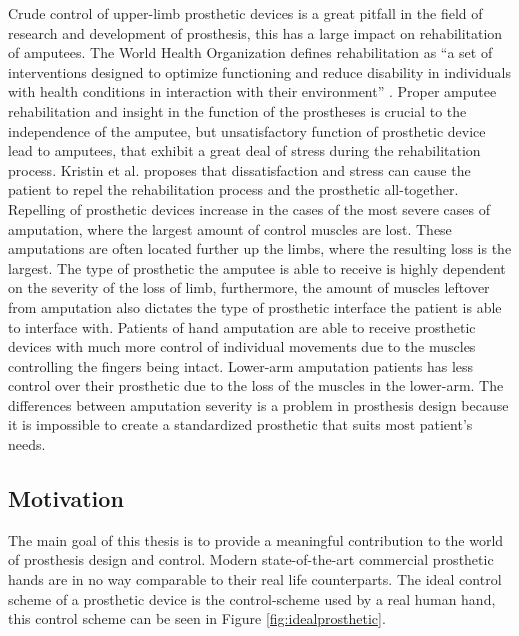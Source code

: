 \documentclass[../main.tex]{subfiles}
\begin{document}
Crude control of upper-limb prosthetic devices is a great pitfall in the field of research and development of prosthesis, this has a large impact on rehabilitation of amputees.
The World Health Organization defines rehabilitation as ``a set of interventions designed to optimize functioning and reduce disability in individuals with health conditions in interaction with their environment'' \cite{WHO_rehab}.
Proper amputee rehabilitation and insight in the function of the prostheses is crucial to the independence of the amputee, but unsatisfactory function of prosthetic device lead to amputees, that exhibit a great deal of stress during the rehabilitation process.
Kristin et al. \cite{Kristin2012} proposes that dissatisfaction and stress can cause the patient to repel the rehabilitation process and the prosthetic all-together.
Repelling of prosthetic devices increase in the cases of the most severe cases of amputation, where the largest amount of control muscles are lost.
These amputations are often located further up the limbs, where the resulting loss is the largest.
The type of prosthetic the amputee is able to receive is highly dependent on the severity of the loss of limb, furthermore, the amount of muscles leftover from amputation also dictates the type of prosthetic interface the patient is able to interface with.
Patients of hand amputation are able to receive prosthetic devices with much more control of individual movements due to the muscles controlling the fingers being intact. 
Lower-arm amputation patients has less control over their prosthetic due to the loss of the muscles in the lower-arm.
The differences between amputation severity is a problem in prosthesis design because it is impossible to create a standardized prosthetic that suits most patient's needs.

\subsection{Motivation}

The main goal of this thesis is to provide a meaningful contribution to the world of prosthesis design and control.
Modern state-of-the-art commercial prosthetic hands are in no way comparable to their real life counterparts.
The ideal control scheme of a prosthetic device is the control-scheme used by a real human hand, this control scheme can be seen in Figure \ref{fig:idealprosthetic}.
\end{document}
